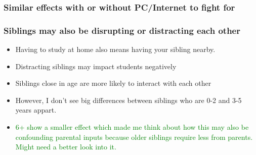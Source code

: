 \documentclass{beamer}
\begin{document}
\begin{frame}
    \label{frame:pcinternet}
    \frametitle{Similar effects with or without PC/Internet to fight for}
        {
    }

    \begin{flushleft}
        \hyperlink{frame:pcinternet_siblings}{}
    \end{flushleft}    

\end{frame}



\begin{frame}
    \label{frame:siblingdisruption_intro}
    \frametitle{Siblings may also be disrupting or distracting each other}
       \begin{itemize}
           \item Having to study at home also means having your sibling nearby. 
           \item Distracting siblings may impact students negatively
           \item Siblings close in age are more likely to interact with each other
           \item However, I don't see big differences between siblings who are 0-2 and 3-5 years appart. 
           \item \textcolor{green}{6+ show a smaller effect which made me think about how this may also be confounding parental inputs because older siblings require less from parents. Might need a better look into it.}
       \end{itemize}
\end{frame}
\end{document}

